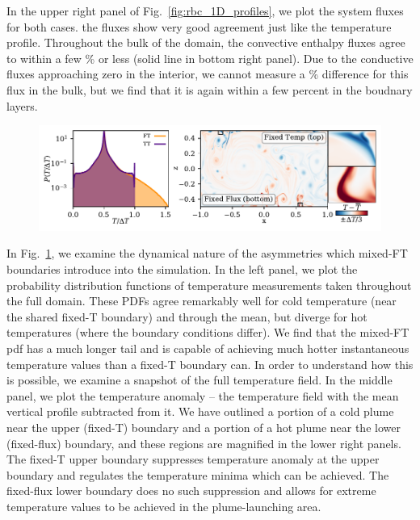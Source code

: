 \documentclass[aps, pre, onecolumn, nofootinbib, notitlepage, groupedaddress, amsfonts, amssymb, amsmath, longbibliography]{revtex4-1}
\begin{document}
In the upper right panel of Fig.~\ref{fig:rbc_1D_profiles}, we plot the system fluxes for both cases.
the fluxes show very good agreement just like the temperature profile.
Throughout the bulk of the domain, the convective enthalpy fluxes agree to within a few \% or less (solid line in bottom right panel).
Due to the conductive fluxes approaching zero in the interior, we cannot measure a \% difference for this flux in the bulk, but we find that it is again within a few percent in the boudnary layers.

\begin{figure}
\includegraphics[width=\textwidth]{./figs/rbc_dynamics_asymmetries.pdf}
\caption{ 
\label{fig:rbc_dynamics_asymmetries} }
\end{figure}

In Fig.~\ref{fig:rbc_dynamics_asymmetries}, we examine the dynamical nature of the asymmetries which mixed-FT boundaries introduce into the simulation.
In the left panel, we plot the probability distribution functions of temperature measurements taken throughout the full domain.
These PDFs agree remarkably well for cold temperature (near the shared fixed-T boundary) and through the mean, but diverge for hot temperatures (where the boundary conditions differ).
We find that the mixed-FT pdf has a much longer tail and is capable of achieving much hotter instantaneous temperature values than a fixed-T boundary can.
In order to understand how this is possible, we examine a snapshot of the full temperature field.
In the middle panel, we plot the temperature anomaly -- the temperature field with the mean vertical profile subtracted from it.
We have outlined a portion of a cold plume near the upper (fixed-T) boundary and a portion of a hot plume near the lower (fixed-flux) boundary, and these regions are magnified in the lower right panels.
The fixed-T upper boundary suppresses temperature anomaly at the upper boundary and regulates the temperature minima which can be achieved.
The fixed-flux lower boundary does no such suppression and allows for extreme temperature values to be achieved in the plume-launching area.
\end{document}
